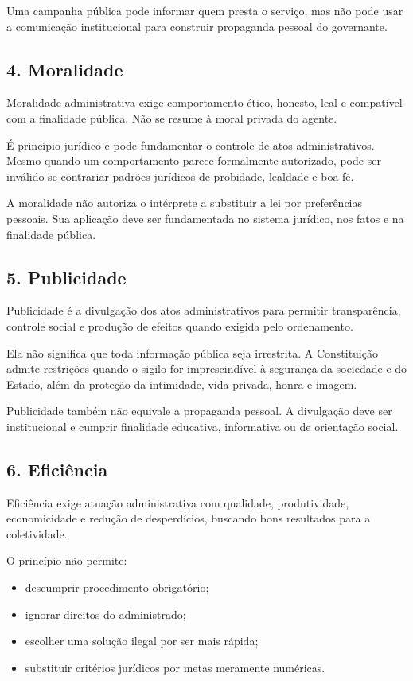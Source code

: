 \documentclass[11pt,a4paper]{article}
\begin{document}
Uma campanha pública pode informar quem presta o serviço, mas não pode usar a comunicação institucional para construir propaganda pessoal do governante.

\subsection*{4. Moralidade}

Moralidade administrativa exige comportamento ético, honesto, leal e compatível com a finalidade pública. Não se resume à moral privada do agente.

É princípio jurídico e pode fundamentar o controle de atos administrativos. Mesmo quando um comportamento parece formalmente autorizado, pode ser inválido se contrariar padrões jurídicos de probidade, lealdade e boa-fé.

A moralidade não autoriza o intérprete a substituir a lei por preferências pessoais. Sua aplicação deve ser fundamentada no sistema jurídico, nos fatos e na finalidade pública.

\subsection*{5. Publicidade}

Publicidade é a divulgação dos atos administrativos para permitir transparência, controle social e produção de efeitos quando exigida pelo ordenamento.

Ela não significa que toda informação pública seja irrestrita. A Constituição admite restrições quando o sigilo for imprescindível à segurança da sociedade e do Estado, além da proteção da intimidade, vida privada, honra e imagem.

Publicidade também não equivale a propaganda pessoal. A divulgação deve ser institucional e cumprir finalidade educativa, informativa ou de orientação social.

\subsection*{6. Eficiência}

Eficiência exige atuação administrativa com qualidade, produtividade, economicidade e redução de desperdícios, buscando bons resultados para a coletividade.

O princípio não permite:

\begin{itemize}
  \item descumprir procedimento obrigatório;
  \item ignorar direitos do administrado;
  \item escolher uma solução ilegal por ser mais rápida;
  \item substituir critérios jurídicos por metas meramente numéricas.
\end{itemize}
\end{document}
